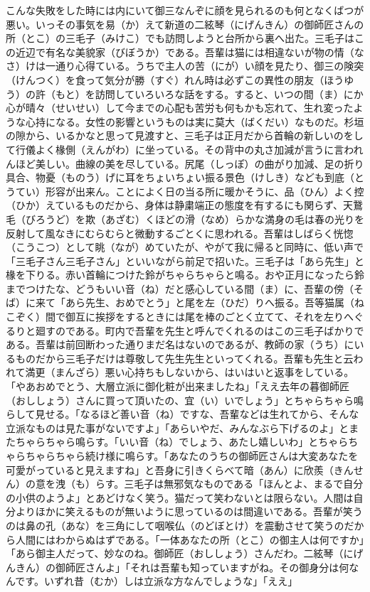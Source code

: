 \documentclass{book}
\begin{document}
こんな失敗をした時には内にいて御三なんぞに顔を見られるのも何となくばつが悪い。いっその事気を易（か）えて新道の二絃琴（にげんきん）の御師匠さんの所（とこ）の三毛子（みけこ）でも訪問しようと台所から裏へ出た。三毛子はこの近辺で有名な美貌家（びぼうか）である。吾輩は猫には相違ないが物の情（なさ）けは一通り心得ている。うちで主人の苦（にが）い顔を見たり、御三の険突（けんつく）を食って気分が勝（すぐ）れん時は必ずこの異性の朋友（ほうゆう）の許（もと）を訪問していろいろな話をする。すると、いつの間（ま）にか心が晴々（せいせい）して今までの心配も苦労も何もかも忘れて、生れ変ったような心持になる。女性の影響というものは実に莫大（ばくだい）なものだ。杉垣の隙から、いるかなと思って見渡すと、三毛子は正月だから首輪の新しいのをして行儀よく椽側（えんがわ）に坐っている。その背中の丸さ加減が言うに言われんほど美しい。曲線の美を尽している。尻尾（しっぽ）の曲がり加減、足の折り具合、物憂（ものう）げに耳をちょいちょい振る景色（けしき）なども到底（とうてい）形容が出来ん。ことによく日の当る所に暖かそうに、品（ひん）よく控（ひか）えているものだから、身体は静粛端正の態度を有するにも関らず、天鵞毛（びろうど）を欺（あざむ）くほどの滑（なめ）らかな満身の毛は春の光りを反射して風なきにむらむらと微動するごとくに思われる。吾輩はしばらく恍惚（こうこつ）として眺（なが）めていたが、やがて我に帰ると同時に、低い声で「三毛子さん三毛子さん」といいながら前足で招いた。三毛子は「あら先生」と椽を下りる。赤い首輪につけた鈴がちゃらちゃらと鳴る。おや正月になったら鈴までつけたな、どうもいい音（ね）だと感心している間（ま）に、吾輩の傍（そば）に来て「あら先生、おめでとう」と尾を左（ひだ）りへ振る。吾等猫属（ねこぞく）間で御互に挨拶をするときには尾を棒のごとく立てて、それを左りへぐるりと廻すのである。町内で吾輩を先生と呼んでくれるのはこの三毛子ばかりである。吾輩は前回断わった通りまだ名はないのであるが、教師の家（うち）にいるものだから三毛子だけは尊敬して先生先生といってくれる。吾輩も先生と云われて満更（まんざら）悪い心持ちもしないから、はいはいと返事をしている。「やあおめでとう、大層立派に御化粧が出来ましたね」「ええ去年の暮御師匠（おししょう）さんに買って頂いたの、宜（い）いでしょう」とちゃらちゃら鳴らして見せる。「なるほど善い音（ね）ですな、吾輩などは生れてから、そんな立派なものは見た事がないですよ」「あらいやだ、みんなぶら下げるのよ」とまたちゃらちゃら鳴らす。「いい音（ね）でしょう、あたし嬉しいわ」とちゃらちゃらちゃらちゃら続け様に鳴らす。「あなたのうちの御師匠さんは大変あなたを可愛がっていると見えますね」と吾身に引きくらべて暗（あん）に欣羨（きんせん）の意を洩（も）らす。三毛子は無邪気なものである「ほんとよ、まるで自分の小供のようよ」とあどけなく笑う。猫だって笑わないとは限らない。人間は自分よりほかに笑えるものが無いように思っているのは間違いである。吾輩が笑うのは鼻の孔（あな）を三角にして咽喉仏（のどぼとけ）を震動させて笑うのだから人間にはわからぬはずである。「一体あなたの所（とこ）の御主人は何ですか」「あら御主人だって、妙なのね。御師匠（おししょう）さんだわ。二絃琴（にげんきん）の御師匠さんよ」「それは吾輩も知っていますがね。その御身分は何なんです。いずれ昔（むか）しは立派な方なんでしょうな」「ええ」
\end{document}
